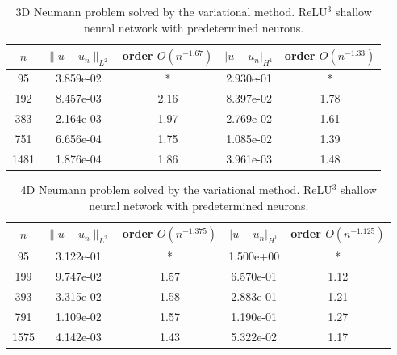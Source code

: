 \documentclass{article}
\theoremstyle{remark}
\begin{document}
      \begin{table}[H]
        \centering
        \begin{tabular}{c|c|c|c|c}
$n$ & 	 $\|u-u_n \|_{L^2}$ & 	 order $O(n^{-1.67})$ & $ |u-u_n |_{H^1}$ & 	 order $O(n^{-1.33})$\\ \hline \hline 
95 		 &  3.859e-02 &  		 *  &  2.930e-01 &   * \\ \hline  
192 		 &  8.457e-03 &  		 2.16  &  8.397e-02 &  1.78  \\ \hline  

383 		 &  2.164e-03 &  		 1.97  &  2.769e-02 &  1.61  \\ \hline  

751 		 &  6.656e-04 &  		 1.75  &  1.085e-02 &  1.39  \\ \hline  

1481 		 &  1.876e-04 &  		 1.86  &  3.961e-03 &  1.48  \\ \hline  
        \end{tabular}
        \caption{3D Neumann problem solved by the variational method. ReLU$^3$ shallow neural network with predetermined neurons. }
        \label{tab:Neuman-RFM-ex1-3d}
    \end{table}
    
      \begin{table}[H]
        \centering
        \begin{tabular}{c|c|c|c|c}
$n$ & 	 $\|u-u_n \|_{L^2}$ & 	 order $O(n^{-1.375})$ & $ |u-u_n |_{H^1}$ & 	 order $O(n^{-1.125})$\\ \hline \hline 
95 		 &  3.122e-01 &  		*  &  1.500e+00 &  *\\ \hline  
199 		 &  9.747e-02 &  		 1.57  &  6.570e-01 &  1.12  \\ \hline  
393 		 &  3.315e-02 &  		 1.58  &  2.883e-01 &  1.21  \\ \hline  
791 		 &  1.109e-02 &  		 1.57  &  1.190e-01 &  1.27  \\ \hline  
1575 		 &  4.142e-03 &  		 1.43  &  5.322e-02 &  1.17  \\ \hline 
        \end{tabular}
        \caption{4D Neumann problem solved by the variational method. ReLU$^3$ shallow neural network with predetermined neurons.}
        \label{tab:Neuman-RFM-ex1-4d}
    \end{table}
\end{document}
